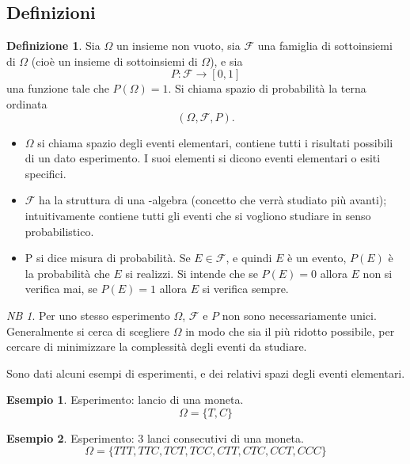 \documentclass{article}
\theoremstyle{plain}
\theoremstyle{definition}
\newtheorem{definizione}{Definizione}[section]
\newtheorem{esempio}{Esempio}[section]
\theoremstyle{remark}
\newtheorem*{NB}{NB}
\begin{document}
\subsection{Definizioni} %
\label{sub:definizioni}
\begin{definizione}
	Sia $\Omega$ un insieme non vuoto, sia $\mathcal{F}$ una famiglia di sottoinsiemi di $\Omega$ (cioè un insieme di sottoinsiemi di $\Omega$), e sia
	\begin{equation*}
		P:\mathcal{F}\to[0,1]
	\end{equation*}
	una funzione tale che $P(\Omega)=1$. Si chiama spazio di probabilità la terna ordinata
	\begin{equation*}
		(\Omega,\mathcal{F},P)\text{.}
	\end{equation*}
\end{definizione}
\begin{itemize}
	\item $\Omega$ si chiama spazio degli eventi elementari, contiene tutti i risultati possibili di un dato esperimento. I suoi elementi si dicono eventi elementari o esiti specifici.
	\item $\mathcal{F}$ ha la struttura di una \sigma-algebra (concetto che verrà studiato più avanti); intuitivamente contiene tutti gli eventi che si vogliono studiare in senso probabilistico.
	\item P si dice misura di probabilità. Se $E\in\mathcal{F}$, e quindi $E$ è un evento, $P(E)$ è la probabilità che $E$ si realizzi. Si intende che se $P(E)=0$ allora $E$ non si verifica mai, se $P(E)=1$ allora $E$ si verifica sempre.
\end{itemize}
\begin{NB}
	Per uno stesso esperimento $\Omega$, $\mathcal{F}$ e $P$ non sono necessariamente unici. Generalmente si cerca di scegliere $\Omega$ in modo che sia il più ridotto possibile, per cercare di minimizzare la complessità degli eventi da studiare.
\end{NB}
Sono dati alcuni esempi di esperimenti, e dei relativi spazi degli eventi elementari.
\begin{esempio}
	Esperimento: lancio di una moneta.
	\begin{equation*}
		\Omega=\{T,C\}
	\end{equation*}
\end{esempio}
\begin{esempio}
	Esperimento: 3 lanci consecutivi di una moneta.
	\begin{equation*}
		\Omega=\{TTT, TTC, TCT, TCC, CTT, CTC, CCT, CCC\}
	\end{equation*}
\end{esempio}
\end{document}
